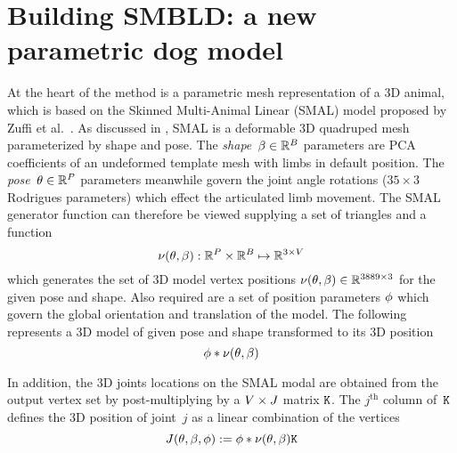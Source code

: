 
\section{Building SMBLD: a new parametric dog model}


At the heart of the method is a parametric mesh representation of a 3D animal, which is based on the Skinned Multi-Animal Linear (SMAL) model proposed by Zuffi et al.~\cite{zuffi2017menagerie}. As discussed in , SMAL is a deformable 3D quadruped mesh parameterized by shape and pose. The \emph{shape}~$\beta \in {\mathbb{R}^{B}}$ parameters are PCA coefficients of an undeformed template mesh with limbs in default position. The \emph{pose}~$\theta \in {\mathbb{R}^{P}}$ parameters meanwhile govern the joint angle rotations ($35 \times 3$ Rodrigues parameters) which effect the articulated limb movement. The SMAL generator function can therefore be viewed supplying a set of triangles and a function 
\begin{equation}
\nu(\theta, \beta) : {\mathbb{R}^{P}} \times {\mathbb{R}^{B}} \mapsto {\mathbb{R}^{3 \times V}}
\end{equation}
which generates the set of 3D model vertex positions $\nu(\theta, \beta) \in {\mathbb{R}^{3889 \times 3}}$ for the given pose and shape. Also required are a set of position parameters $\phi$ which govern the global orientation and translation of the model. The following represents a 3D model of given pose and shape transformed to its 3D position
\begin{equation}
    \phi * \nu(\theta, \beta)
\end{equation}    

In addition, the 3D joints locations on the SMAL modal are obtained from the output vertex set by post-multiplying by a $V \times J$ matrix $\mathtt{K}$.  The $j^{\text{th}}$ column of~$\mathtt{K}$ defines the 3D position of joint~$j$ as a linear combination of the vertices
\begin{equation}
J(\theta, \beta, \phi) := \phi * \nu(\theta, \beta) \mathtt{K}
\end{equation}


